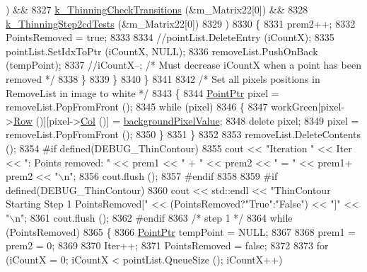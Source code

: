 \begin{DoxyCode}
      )  &&
8327            \hyperlink{_raster_8cpp_a26369c862acddcbd9e8b1eb2913adb20}{k\_ThinningCheckTransitions} (&m\_Matrix22[0])                           
                               &&
8328            \hyperlink{_raster_8cpp_ad105800cd4251636e5f095579574a73b}{k\_ThinningStep2cdTests}     (&m\_Matrix22[0])
8329           )
8330       \{
8331         prem2++;
8332         PointsRemoved = \textcolor{keyword}{true};
8333        
8334         \textcolor{comment}{//pointList.DeleteEntry (iCountX);}
8335         pointList.SetIdxToPtr (iCountX, NULL); 
8336         removeList.PushOnBack (tempPoint);
8337         \textcolor{comment}{//iCountX--; /* Must decrease iCountX when a point has been removed */}
8338       \}
8339     \}
8340   \}
8341 
8342   \textcolor{comment}{/* Set all pixels positions in RemoveList in image to white */}
8343   \{
8344     \hyperlink{class_k_k_b_1_1_point}{PointPtr}  pixel = removeList.PopFromFront ();
8345     \textcolor{keywordflow}{while}  (pixel)
8346     \{
8347       workGreen[pixel->\hyperlink{class_k_k_b_1_1_point_abfc34bcf809fc9fb95baf5c745b07549}{Row} ()][pixel->\hyperlink{class_k_k_b_1_1_point_afb196b03757fc697f6ade0129a1c7fcf}{Col} ()] = \hyperlink{class_k_k_b_1_1_raster_ab7ed2191cce116a6a37029dc6e3713ef}{backgroundPixelValue};
8348       \textcolor{keyword}{delete} pixel;
8349       pixel = removeList.PopFromFront ();
8350     \}
8351   \}
8352 
8353   removeList.DeleteContents ();
8354 \textcolor{preprocessor}{  #if  defined(DEBUG\_ThinContour)}
8355     cout  << \textcolor{stringliteral}{"Iteration "} << Iter << \textcolor{stringliteral}{": Points removed: "} << prem1 << \textcolor{stringliteral}{" + "} << prem2 << \textcolor{stringliteral}{" = "} << prem1+
      prem2 << \textcolor{stringliteral}{"\(\backslash\)n"};
8356     cout.flush ();
8357 \textcolor{preprocessor}{  #endif}
8358 
8359 \textcolor{preprocessor}{  #if  defined(DEBUG\_ThinContour)}
8360     cout << std::endl << \textcolor{stringliteral}{"ThinContour  Starting Step 1    PointsRemoved["} << (PointsRemoved?\textcolor{stringliteral}{"True"}:\textcolor{stringliteral}{"False"})
       << \textcolor{stringliteral}{"]"} << \textcolor{stringliteral}{"\(\backslash\)n"};
8361     cout.flush ();
8362 \textcolor{preprocessor}{  #endif}
8363   \textcolor{comment}{/* step 1 */}
8364   \textcolor{keywordflow}{while}  (PointsRemoved)
8365   \{
8366     \hyperlink{class_k_k_b_1_1_point}{PointPtr}  tempPoint = NULL;
8367 
8368     prem1 = prem2 = 0;
8369 
8370     Iter++;
8371     PointsRemoved = \textcolor{keyword}{false};
8372 
8373     \textcolor{keywordflow}{for}  (iCountX = 0; iCountX < pointList.QueueSize (); iCountX++)

\end{DoxyCode}
